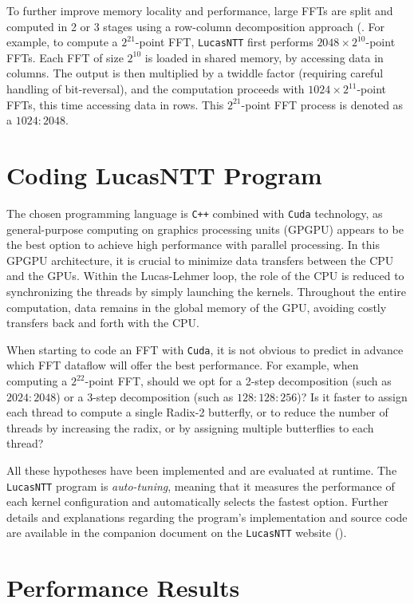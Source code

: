 \documentclass{article}
\begin{document}
To further improve memory locality and performance, large FFTs are split and computed in 2 or 3 stages using a row-column decomposition approach (\cite{Bai89}. For example, to compute a $2^{21}$-point FFT, \texttt{LucasNTT} first performs $2048 \times 2^{10}$-point FFTs. Each FFT of size $2^{10}$ is loaded in shared memory, by accessing data in columns. The output is then multiplied by a twiddle factor (requiring careful handling of bit-reversal), and the computation proceeds with $1024 \times 2^{11}$-point FFTs, this time accessing data in rows. This $2^{21}$-point FFT process is denoted as a \texttt{$1024:2048$}.

\section{Coding LucasNTT Program}

The chosen programming language is \texttt{C++} combined with \texttt{Cuda} technology, as general-purpose computing on graphics processing units (GPGPU) appears to be the best option to achieve high performance with parallel processing. In this GPGPU architecture, it is crucial to minimize data transfers between the CPU and the GPUs. Within the Lucas-Lehmer loop, the role of the CPU is reduced to synchronizing the threads by simply launching the kernels. Throughout the entire computation, data remains in the global memory of the GPU, avoiding costly transfers back and forth with the CPU.

When starting to code an FFT with \texttt{Cuda}, it is not obvious to predict in advance which FFT dataflow will offer the best performance. For example, when computing a $2^{22}$-point FFT, should we opt for a 2-step decomposition (such as $2024:2048$) or a 3-step decomposition (such as $128:128:256$)? Is it faster to assign each thread to compute a single Radix-2 butterfly, or to reduce the number of threads by increasing the radix, or by assigning multiple butterflies to each thread? 

All these hypotheses have been implemented and are evaluated at runtime. The \texttt{LucasNTT} program is \emph{auto-tuning}, meaning that it measures the performance of each kernel configuration and automatically selects the fastest option. Further details and explanations regarding the program's implementation and source code are available in the companion document on the \texttt{LucasNTT} website (\cite{LucasNTT_documents}).

\section{Performance Results}
\end{document}
